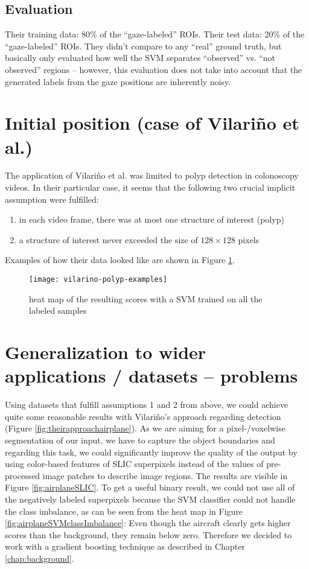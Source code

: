 \subsection{Evaluation}
Their training data: 80\% of the ``gaze-labeled'' ROIs. Their test data: 20\% of the ``gaze-labeled'' ROIs. They didn't compare to any ``real'' ground truth, but basically only evaluated how well the SVM separates ``observed'' vs. ``not observed'' regions  -- however, this evaluation does not take into account that the generated labels from the gaze positions are inherently noisy.


\section{Initial position (case of Vilari\~no et al.)}
The application of Vilari\~no et al. was limited to polyp detection in colonoscopy videos. In their particular case, it seems that the following two crucial implicit assumption were fulfilled:
\begin{enumerate}
 \item in each video frame, there was at most one structure of interest (polyp)
 \item a structure of interest never exceeded the size of $128 \times 128$ pixels
\end{enumerate}
Examples of how their data looked like are shown in Figure \ref{fig:vilarinoPolypExamples}.

\begin{figure}[ht]
	\centering
	\texttt{[image: vilarino-polyp-examples]}
	\caption{heat map of the resulting scores with a SVM trained on all the labeled samples }
	\label{fig:vilarinoPolypExamples}
\end{figure}


\section{Generalization to wider applications / datasets -- problems}
Using datasets that fulfill assumptions 1 and 2 from above, we could achieve quite some reasonable results with Vilari\~no's approach regarding detection (Figure \ref{fig:theirapproachairplane}). As we are aiming for a pixel-/voxelwise segmentation of our input, we have to capture the object boundaries and regarding this task, we could significantly improve the quality of the output by using color-based features  of SLIC superpixels instead of the values of pre-processed image patches to describe image regions. The results are visible in Figure \ref{fig:airplaneSLIC}. To get a useful binary result, we could not use all of the negatively labeled superpixels because the SVM classifier could not handle the class imbalance, as can be seen from the heat map in Figure \ref{fig:airplaneSVMclassImbalance}: Even though the aircraft clearly gets higher scores than the background, they remain below zero. Therefore we decided to work with a gradient boosting technique as described in Chapter \ref{chap:background}.

